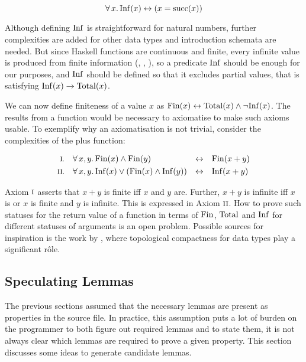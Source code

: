 \begin{equation*}
\forall \, x . \, \mathrm{Inf}(x) \leftrightarrow (x = \mathrm{succ}(x))
\end{equation*}

Although defining $\mathrm{Inf}$ is straightforward for natural numbers, further
complexities are added for other data types and introduction schemata
are needed. But since Haskell functions are continuous and finite,
every infinite value is produced from finite information (,
, ), so a predicate $\mathrm{Inf}$ should be enough
for our purposes, and $\mathrm{Inf}$ should be defined so that it excludes
partial values, that is satisfying $\mathrm{Inf}(x) \rightarrow \mathrm{Total}(x)$.

\pagebreak

We can now define finiteness of a value $x$ as $\mathrm{Fin}(x)
\leftrightarrow \mathrm{Total}(x) \wedge \neg \mathrm{Inf}(x)$.  The results from a
function would be necessary to axiomatise to make such axioms
usable. To exemplify why an axiomatisation is not trivial, consider
the complexities of the plus function:

\begin{align*}
\rom{1} && \faa{x}{y} & \Fin(x) \wedge \Fin(y)                  & \leftrightarrow &&& \Fin(x + y) \\
\rom{2} && \faa{x}{y} & \Inf(x) \vee (\Fin(x) \wedge \Inf(y)) & \leftrightarrow &&& \Inf(x + y)
\end{align*}

\noindent
Axiom $\romnodot{1}$ asserts that $x + y$ is finite iff $x$ and $y$
are. Further, $x + y$ is infinite iff $x$ is or $x$ is finite and
$y$ is infinite. This is expressed in Axiom $\romnodot{2}$. How to
prove such statuses for the return value of a function in terms of
$\mathrm{Fin}$, $\mathrm{Total}$ and $\mathrm{Inf}$ for different statuses of arguments is an
open problem. Possible sources for inspiration is the work by
\cite{exhaustiblesets}, where topological compactness for data types
play a significant r\^{o}le.

\subsection{Speculating Lemmas}

The previous sections assumed that the necessary lemmas are present as
properties in the source file. In practice, this assumption puts a lot
of burden on the programmer to both figure out required lemmas and to
state them, it is not always clear which lemmas are required to prove
a given property. This section discusses some ideas to generate
candidate lemmas.

